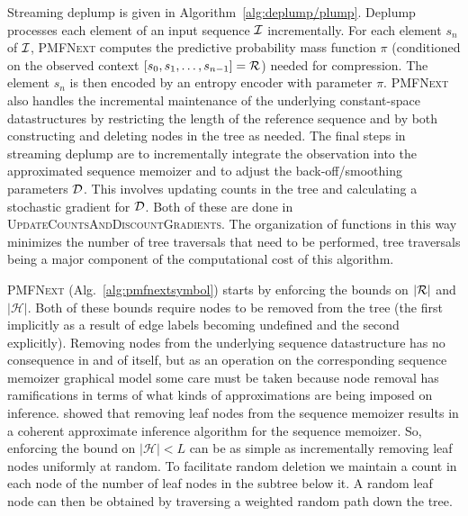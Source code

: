 Streaming deplump is given in Algorithm~\ref{alg:deplump/plump}.  Deplump processes each element of an input sequence $\IS$ incrementally.  For each element $s_n$ of $\IS$, \textsc{PMFNext} computes the predictive probability mass function $\pi$ (conditioned on the observed context $[s_0, s_1, \ldots, s_{n-1}] = \RS$) needed for compression.  The element $s_n$ is then encoded by an entropy encoder with parameter $\pi$.  \textsc{PMFNext} also handles the incremental maintenance of the underlying constant-space datastructures by restricting the length of the reference sequence and by both constructing and deleting nodes in the tree as needed.  The final steps in streaming deplump are to incrementally integrate the observation into the approximated sequence memoizer and to adjust the back-off/smoothing parameters $\D$.  This involves updating counts in the tree and calculating a stochastic gradient for $\D$.  Both of these are done in \textsc{UpdateCountsAndDiscountGradients}. %
The organization of functions in this way minimizes the number of tree traversals that need to be performed, tree traversals being a major component of the computational cost of this algorithm.

\textsc{PMFNext} (Alg.~\ref{alg:pmfnextsymbol}) starts by enforcing the bounds on $|\RS|$ and $|\mathcal{H}|$.  Both of these bounds require nodes to be removed from the tree (the first implicitly as a result of edge labels becoming undefined and the second explicitly).  Removing nodes from the underlying sequence datastructure has no consequence in and of itself, but as an operation on the corresponding sequence memoizer graphical model some care must be taken because node removal has ramifications in terms of what kinds of approximations are being imposed on inference.  \cite{Bartlett2010} showed that removing leaf nodes from the sequence memoizer results in a coherent approximate inference algorithm for the sequence memoizer.  So, enforcing the bound on $| \mathcal{H} | < L$ can be as simple as incrementally removing leaf nodes uniformly at random.  To facilitate random deletion we maintain a count in each node of the number of leaf nodes in the subtree below it.  A random leaf node can then be obtained by traversing a weighted random path down the tree.  

